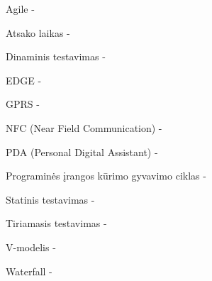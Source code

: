 \documentclass{VUMIFPSkursinis}
\begin{document}
\printbibliography[heading=bibintoc]  %

Agile - 

Atsako laikas - 

Dinaminis testavimas - 

EDGE - 

GPRS - 

NFC (Near Field Communication) - 

PDA (Personal Digital Assistant) - 

Programinės įrangos kūrimo gyvavimo ciklas - 

Statinis testavimas - 

Tiriamasis testavimas - 

V-modelis - 

Waterfall - 

\appendix  %
\end{document}
